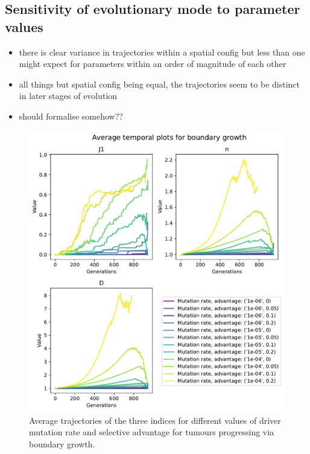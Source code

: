 \subsection{Sensitivity of evolutionary mode to parameter values}
\begin{itemize}
    \item there is clear variance in trajectories within a spatial config but less than one might expect for parameters within an order of magnitude of each other
    \item all things but spatial config being equal, the trajectories seem to be distinct in later stages of evolution
    \item should formalise somehow??
\end{itemize}
\begin{figure}
    \centering
    \includegraphics[width=\textwidth]{Chapter_trajectories/figures/boundary-temporal.pdf}
    \caption{Average trajectories of the three indices for different values of driver mutation rate and selective advantage for tumours progressing via boundary growth.}
    \label{fig:boundary-temporal}
\end{figure}
